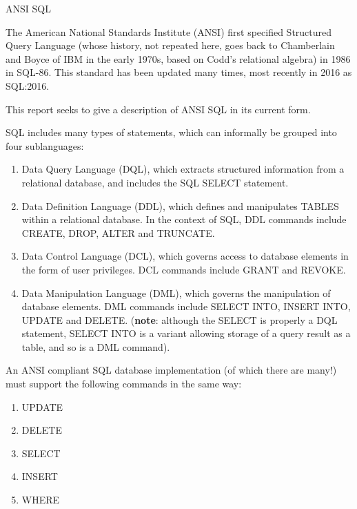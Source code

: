 \documentclass[10pt]{article}
\begin{document}
\thispagestyle{empty}
\pagestyle{empty}

\begin{center}\textsc{\Large ANSI SQL}\end{center}

The American National Standards Institute (ANSI) first specified Structured Query Language (whose history, not repeated here, goes back to Chamberlain and Boyce of IBM in the early 1970s, based on Codd's relational algebra) in 1986 in SQL-86.  This standard has been updated many times, most recently in 2016 as SQL:2016.

This report seeks to give a description of ANSI SQL in its current form.

SQL includes many types of statements, which can informally be grouped into four sublanguages:
\begin{enumerate}
	\item Data Query Language (DQL), which extracts structured information from a relational database, and includes the SQL SELECT statement.
	\item Data Definition Language (DDL), which defines and manipulates TABLES within a relational database.  In the context of SQL, DDL commands include CREATE, DROP, ALTER and TRUNCATE.
	\item Data Control Language (DCL), which governs access to database elements in the form of user privileges.  DCL commands include GRANT and REVOKE.
	\item Data Manipulation Language (DML), which governs the manipulation of database elements.  DML commands include SELECT INTO, INSERT INTO, UPDATE and DELETE.  (\textbf{note}: although the SELECT is properly a DQL statement, SELECT INTO is a variant allowing storage of a query result as a table, and so is a DML command).
\end{enumerate}


An ANSI compliant SQL database implementation (of which there are many!) must support the following commands in the same way:
\begin{enumerate}
	\item UPDATE
	\item DELETE
	\item SELECT
	\item INSERT
	\item WHERE
\end{enumerate}
\end{document}
